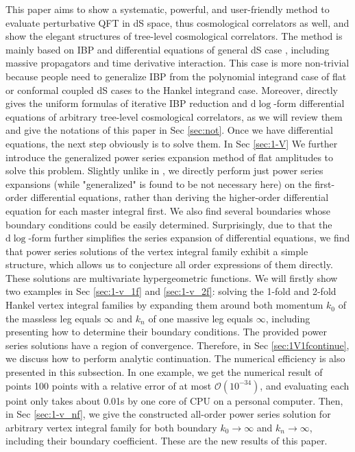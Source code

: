 \documentclass[a4paper,11pt]{article}
\newcommand{\nd}{\mathrm{d}}
\begin{document}
 This paper aims to show a systematic, powerful, and user-friendly method to evaluate perturbative QFT in dS space, thus cosmological correlators as well, and show the elegant structures of tree-level cosmological correlators. The method is mainly based on IBP and differential equations of general dS case \cite{Chen:2023iix}, including massive propagators and time derivative interaction.   This case is more non-trivial because people need to generalize IBP from the polynomial integrand case of flat or conformal coupled dS cases to the Hankel integrand case. Moreover, \cite{Chen:2023iix} directly gives the uniform formulas of iterative IBP reduction and $\nd \log$-form differential equations of arbitrary tree-level cosmological correlators, as we will review them and give the notations of this paper in Sec \ref{sec:not}.
Once we have differential equations, the next step obviously is to solve them. In Sec \ref{sec:1-V} We further introduce the generalized power series expansion method \cite{Moriello:2019yhu} of flat amplitudes to solve this problem. Slightly unlike in \cite{Moriello:2019yhu}, we directly perform just power series expansions (while "generalized" is found to be not necessary here) on the first-order differential equations, rather than deriving the higher-order differential equation for each master integral first. We also find several boundaries whose boundary conditions could be easily determined.
 Surprisingly, due to that the $\nd \log$-form further simplifies the series expansion of differential equations, we find that power series solutions of the vertex integral family exhibit a simple structure, which allows us to conjecture all order expressions of them directly. These solutions are multivariate hypergeometric functions.  We will firstly show two examples in Sec \ref{sec:1-v_1f} and \ref{sec:1-v_2f}: solving the 1-fold and 2-fold Hankel vertex integral families by expanding them around both momentum $k_0$ of the massless leg equals $\infty$ and $k_n$ of one massive leg equals $\infty$, including presenting how to determine their boundary conditions.  The provided power series solutions have a region of convergence. Therefore, in Sec \ref{sec:1V1fcontinue}, we discuss how to perform analytic continuation. The numerical efficiency is also presented in this subsection. In one example, we get the numerical result of points 100 points with a relative error of at most \(\mathcal{O}(10^{-34})\), and evaluating each point only takes about 0.01s by one core of CPU on a personal computer. Then, in Sec \ref{sec:1-v_nf}, we give the constructed all-order power series solution for arbitrary vertex integral family for both boundary $k_0\to\infty$ and $k_n\to\infty$, including their boundary coefficient. These are the new results of this paper.
\end{document}
